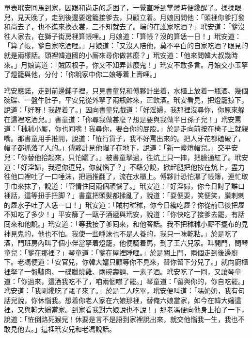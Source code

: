 單表玳安囘馬到家，因跟和尚走的乏困了，一覺直睡到掌燈時便纔醒了。揉揉眼兒，見天晚了，走到後邊要燈籠接爹去，只顧立着。月娘因問他：「頭裡你爹打發和尚去了，也不進來換衣裳，三不知就去了。端的在誰家吃酒？」玳安道：「爹沒徃人家去，在獅子街房裡算帳哩。」月娘道：「算帳？沒的算恁一日！」玳安道：「算了帳，爹自家吃酒哩。」月娘道：「又沒人陪他，莫不平白的自家吃酒？眼見的就是兩樣話。頭裡韓道國的小厮來尋你做甚麼？」玳安道：「他來問韓大叔幾時來。」月娘罵道：「賊囚根子，你又不知弄甚麼鬼！」玳安不敢多言。月娘交小玉拏了燈籠與他，分付：「你說家中你二娘等着上壽哩。」

玳安應諾，走到前邊鋪子裡，只見書童兒和傅夥計坐着，水櫃上放着一瓶酒、幾個碗碟、一盤牛肚子，平安兒從外拏了兩瓶鮓來，正飲酒。玳安看見，把燈籠掠下，說道：「好呀！我趕着了。」因向書童兒戲道：「好淫婦，我那裡沒尋你，你原來躲在這裡吃酒兒。」書童道：「你尋我做甚麼？想是要與我做半日孫子兒！」玳安罵道：「秫秫小厮，你也囘嘴！我尋你，要㒲你的屁股。」於是走向前按在椅子上就親嘴。那書童用手推開，說道：「恠行貨子，我不好罵出來的。把人牙花都磕破了，帽子都抓落了人的。」傅夥計見他帽子在地下，說道：「新一盞燈帽兒。」交平安兒：「你替他拾起來，只怕躧了。」被書童拏過，徃炕上只一摔，把臉通紅了。玳安道：「好淫婦，我逗你逗兒，你就惱了？」不繇分說，掀起腿把他按在炕上，盡力徃他口裡吐了一口唾沫，把酒推翻了，流在水櫃上。傅夥計恐怕濕了帳簿，連忙取手巾來抹了，說道：「管情住囘兩個頑惱了。」玳安道：「好淫婦，你今日討了誰口裡話，這等扭手扭脚？」書童把頭髮都揉亂了，說道：「耍便耍，笑便笑，臢剌剌的㞞水子吐了人恁一口！」玳安道：「賊村秫秫，你今日纔吃㞞？你從前已後把㞞不知吃了多少！」平安篩了一甌子酒遞與玳安，說道：「你快吃了接爹去罷，有話囘來和他說。」玳安道：「等我接了爹囘來，和他答話。我不把秫秫小厮不擺布的見神見鬼的，他也不怕。我使一些唾沫也不是人養的，我只一味乾粘。」於是吃了酒，門班房內叫了個小伴當拏着燈籠，他便騎着馬，到了王六兒家。叫開門，問琴童兒：「爹在那裡？」琴童道：「爹在屋裡睡哩。」於是關上門，兩個走到後邊廚下。老馮便道：「安官兒，你韓大嬸只顧等你不見來，替你留下分兒了。」就向廚櫃裡拏了一盤驢肉、一碟臘燒雞、兩碗壽麵、一素子酒。玳安吃了一囘，又讓琴童道：「你過來，這酒我吃不了，咱兩個噤了罷。」琴童道：「留與你的，你自吃罷。」玳安道：「我剛纔吃了甌子來了。」於是二人吃畢，玳安便叫道：「馮奶奶，我有句話兒說，你休惱我。想着你老人家在六娘那裡，替俺六娘當家，如今在韓大嬸這裡，又與韓大嬸當家。{}到家看我對六娘說也不說！」那老馮便向他身上拍了一下，說道：「恠倒路死猴兒！休要是言不是語到家裡說出來，就交他惱我一生，我也不敢見他去。」這裡玳安兒和老馮說話。

